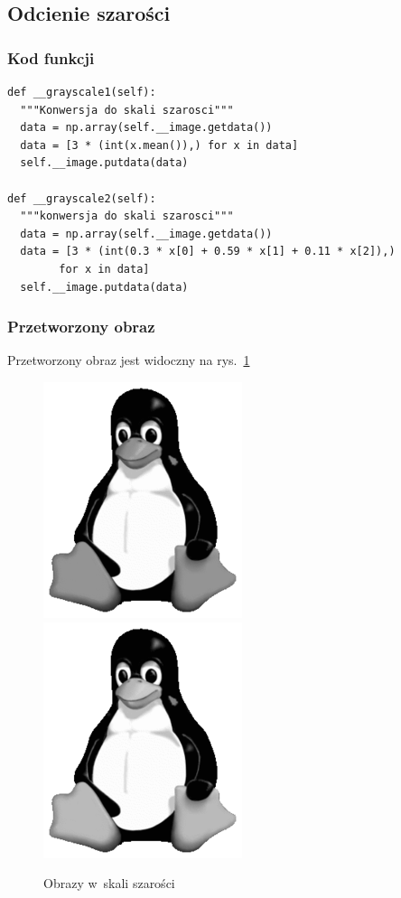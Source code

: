 \documentclass[12pt,a4paper]{article}
\begin{document}
\subsection{Odcienie szarości}
\subsubsection{Kod funkcji}
\begin{lstlisting}
def __grayscale1(self):
  """Konwersja do skali szarosci"""
  data = np.array(self.__image.getdata())
  data = [3 * (int(x.mean()),) for x in data]
  self.__image.putdata(data)

def __grayscale2(self):
  """konwersja do skali szarosci"""
  data = np.array(self.__image.getdata())
  data = [3 * (int(0.3 * x[0] + 0.59 * x[1] + 0.11 * x[2]),)
		for x in data]
  self.__image.putdata(data)
\end{lstlisting}
\subsubsection{Przetworzony obraz}
Przetworzony obraz jest widoczny na rys.~\ref{fig:gray}
\begin{figure}[h]
\includegraphics{grayscale1}
\includegraphics{grayscale2}
\caption{Obrazy w~skali szarości}
\label{fig:gray}
\end{figure}
\end{document}
